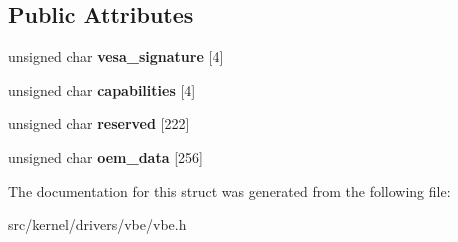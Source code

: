 \subsection*{Public Attributes}
\begin{DoxyCompactItemize}
\item 
\mbox{\label{structvesa__info_a25aa4674a024320ea776846114e88327}} 
unsigned char {\bfseries vesa\+\_\+signature} \mbox{[}4\mbox{]}
\item 
\mbox{\label{structvesa__info_aed6d1e2b854d00b359472d3c57e80d28}} 
unsigned char {\bfseries capabilities} \mbox{[}4\mbox{]}
\item 
\mbox{\label{structvesa__info_ad86d79cd7eb600e3a0efc1ff52108f20}} 
unsigned char {\bfseries reserved} \mbox{[}222\mbox{]}
\item 
\mbox{\label{structvesa__info_a57c98d6807bd6a683fc5366c87887dcc}} 
unsigned char {\bfseries oem\+\_\+data} \mbox{[}256\mbox{]}
\end{DoxyCompactItemize}


The documentation for this struct was generated from the following file\+:\begin{DoxyCompactItemize}
\item 
src/kernel/drivers/vbe/vbe.\+h\end{DoxyCompactItemize}
